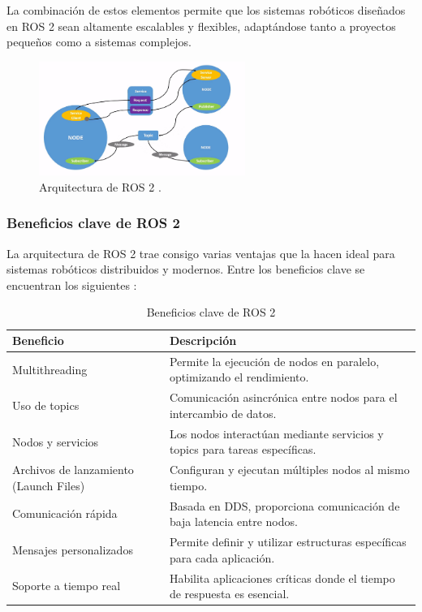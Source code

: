     La combinación de estos elementos permite que los sistemas robóticos diseñados en ROS 2 sean altamente escalables y flexibles, adaptándose tanto a proyectos pequeños como a sistemas complejos.  
    
    \begin{figure}[h!]
        \centering
        \includegraphics[width=0.6\textwidth]{pictures/ros2_arch.png}
        \caption{Arquitectura de ROS 2 \cite{ros_docs}.}
        \label{fig:ros2_architecture}
    \end{figure}
    
    \subsubsection{Beneficios clave de ROS 2}
    
    La arquitectura de ROS 2 trae consigo varias ventajas que la hacen ideal para sistemas robóticos distribuidos y modernos. Entre los beneficios clave se encuentran los siguientes \cite{ros_docs}:  
    
    \begin{table}[h!]
    \centering
    \caption{Beneficios clave de ROS 2}
    \begin{tabular}{|l|p{10cm}|}
    \hline
    \textbf{Beneficio} & \textbf{Descripción} \\
    \hline
    Multithreading & Permite la ejecución de nodos en paralelo, optimizando el rendimiento. \\
    \hline
    Uso de topics & Comunicación asincrónica entre nodos para el intercambio de datos. \\
    \hline
    Nodos y servicios & Los nodos interactúan mediante servicios y topics para tareas específicas. \\
    \hline
    Archivos de lanzamiento (Launch Files) & Configuran y ejecutan múltiples nodos al mismo tiempo. \\
    \hline
    Comunicación rápida & Basada en DDS, proporciona comunicación de baja latencia entre nodos. \\
    \hline
    Mensajes personalizados & Permite definir y utilizar estructuras específicas para cada aplicación. \\
    \hline
    Soporte a tiempo real & Habilita aplicaciones críticas donde el tiempo de respuesta es esencial. \\
    \hline
    \end{tabular}
    \label{table:benefits}
    \end{table}    


